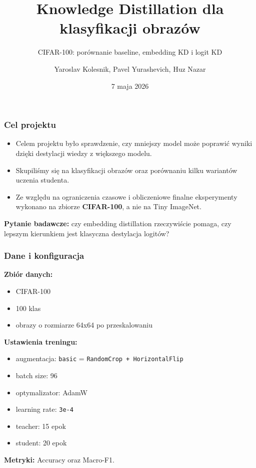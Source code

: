 \documentclass{beamer}
\title{Knowledge Distillation dla klasyfikacji obrazów}
\subtitle{CIFAR-100: porównanie baseline, embedding KD i logit KD}
\author{Yaroslav Kolesnik, Pavel Yurashevich, Huz Nazar}
\date{7 maja 2026}
\begin{document}
\frame{\titlepage}

\begin{frame}
\frametitle{Cel projektu}
\begin{itemize}
    \item Celem projektu było sprawdzenie, czy mniejszy model może poprawić wyniki dzięki destylacji wiedzy z większego modelu.
    \item Skupiliśmy się na klasyfikacji obrazów oraz porównaniu kilku wariantów uczenia studenta.
    \item Ze względu na ograniczenia czasowe i obliczeniowe finalne eksperymenty wykonano na zbiorze \textbf{CIFAR-100}, a nie na Tiny ImageNet.
\end{itemize}
\vspace{0.2cm}
\textbf{Pytanie badawcze:} czy embedding distillation rzeczywiście pomaga, czy lepszym kierunkiem jest klasyczna destylacja logitów?
\end{frame}

\begin{frame}
\frametitle{Dane i konfiguracja}
\textbf{Zbiór danych:}
\begin{itemize}
    \item CIFAR-100
    \item 100 klas
    \item obrazy o rozmiarze 64x64 po przeskalowaniu
\end{itemize}
\vspace{0.2cm}

\textbf{Ustawienia treningu:}
\begin{itemize}
    \item augmentacja: \texttt{basic} = \texttt{RandomCrop + HorizontalFlip}
    \item batch size: 96
    \item optymalizator: AdamW
    \item learning rate: \texttt{3e-4}
    \item teacher: 15 epok
    \item student: 20 epok
\end{itemize}
\vspace{0.2cm}

\textbf{Metryki:} Accuracy oraz Macro-F1.
\end{frame}
\end{document}
